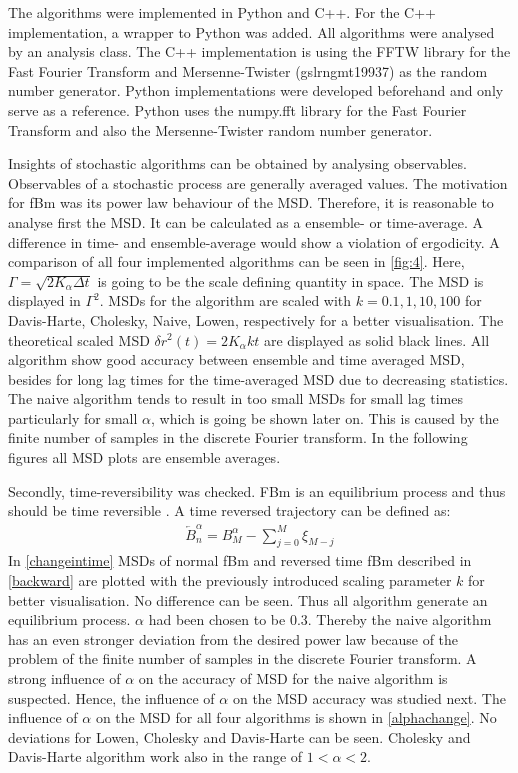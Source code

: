 \documentclass[
  a4paper,BCOR10mm,oneside,
  headsepline,footsepline,%
  fleqn,openbib
]{scrbook}
\begin{document}
The algorithms were implemented in Python and C++. For the C++ implementation, a wrapper to Python was added. All algorithms were analysed by an analysis class. The C++ implementation is using the FFTW library for the Fast Fourier Transform \cite{FFTW} and Mersenne-Twister (gsl\texttt{\textunderscore}rng\texttt{\textunderscore}mt19937) \cite{Matsumoto1998} as the random number generator. Python implementations were developed beforehand and only serve as a reference. Python uses the numpy.fft library for the Fast Fourier Transform and also the Mersenne-Twister random number generator.\par
Insights of stochastic algorithms can be obtained by analysing observables. Observables of a stochastic process are generally averaged values. The motivation for fBm was its power law behaviour of the MSD. Therefore, it is reasonable to analyse first the MSD. It can be calculated as a ensemble- or time-average. A difference in time- and ensemble-average would show a violation of ergodicity. A comparison of all four implemented algorithms can be seen in \cref{fig:4}. Here, $\Gamma=\sqrt{2K_\alpha \Delta t}$ is going to be the scale defining quantity in space. The MSD is displayed in $\Gamma^2$. MSDs for the algorithm are scaled with $k=0.1,1,10,100$ for Davis-Harte, Cholesky, Naive, Lowen, respectively for a better visualisation. The theoretical scaled MSD $\delta r^2 (t)=2 K_\alpha k t$ are displayed as solid black lines. All algorithm show good accuracy between ensemble and time averaged MSD, besides for long lag times for the time-averaged MSD due to decreasing statistics. The naive algorithm tends to result in too small MSDs for small lag times particularly for small $\alpha$, which is going be shown later on. This is caused by the finite number of samples in the discrete Fourier transform. In the following figures all MSD plots are ensemble averages.\par Secondly, time-reversibility was checked. FBm is an equilibrium process and thus should be time reversible  \cite{Horvai2007}. A time reversed trajectory can be defined as:
\begin{align} \label{backward}
 \overleftarrow{B}^{\alpha}_n=B^{\alpha}_M-\sum^M_{j=0} \xi_{M-j}
\end{align}
In \cref{changeintime}  MSDs of normal fBm and reversed time fBm described in \cref{backward} are plotted with the previously introduced scaling parameter $k$ for better visualisation. No difference can be seen. Thus all algorithm generate an equilibrium process. $\alpha$ had been chosen to be $0.3$. Thereby the naive algorithm has an even stronger deviation from the desired power law because of the problem of the finite number of samples in the discrete Fourier transform. A strong influence of $\alpha$ on the accuracy of MSD for the naive algorithm is suspected. Hence, the influence of $\alpha$ on the MSD accuracy was studied next. The influence of $\alpha$ on the MSD for all four algorithms is shown in \cref{alphachange}. No deviations for Lowen, Cholesky and Davis-Harte can be seen. Cholesky and Davis-Harte algorithm work also in the range of $1<\alpha<2$. 
\end{document}
